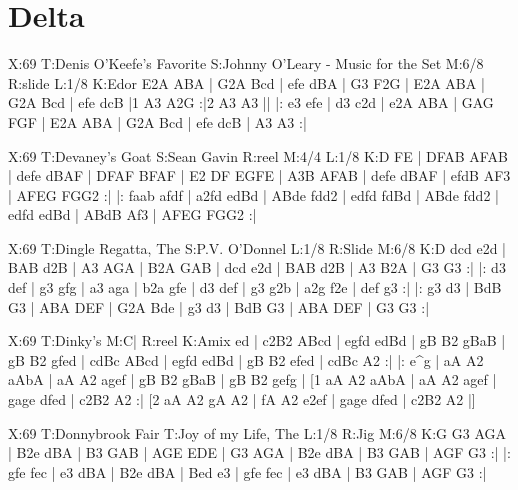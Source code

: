 \documentclass{article}
\begin{document}
\section{Delta}


\begin{abc}[name]
X:69
T:Denis O'Keefe's Favorite
S:Johnny O'Leary - Music for the Set
M:6/8
R:slide
L:1/8
K:Edor
E2A ABA | G2A Bcd | efe dBA | G3 F2G |
E2A ABA | G2A Bcd | efe dcB |1 A3 A2G :|2 A3 A3 ||
|: e3 efe | d3 c2d | e2A ABA | GAG FGF |
E2A ABA | G2A Bcd | efe dcB | A3 A3 :|

\begin{abc}[name]
X:69
T:Devaney's Goat
S:Sean Gavin
R:reel
M:4/4
L:1/8
K:D
FE | DFAB AFAB | defe dBAF | DFAF BFAF | E2 DF EGFE |
A3B AFAB | defe dBAF | efdB AF3 | AFEG FGG2 :|
|: faab afdf | a2fd edBd | ABde fdd2 | edfd fdBd |
ABde fdd2 | edfd edBd | ABdB Af3 | AFEG FGG2 :|
\end{abc}

\begin{abc}[name]
X:69
T:Dingle Regatta, The
S:P.V. O'Donnel
L:1/8
R:Slide
M:6/8
K:D
dcd e2d | BAB d2B | A3 AGA | B2A GAB |
dcd e2d | BAB d2B | A3 B2A | G3 G3 :|
|: d3 def | g3 gfg | a3 aga | b2a gfe |
d3 def | g3 g2b | a2g f2e | def g3 :|
|: g3 d3 | BdB G3 | ABA DEF | G2A Bde |
g3 d3 | BdB G3 | ABA DEF | G3 G3 :|
\end{abc}

\begin{abc}[name]
X:69
T:Dinky's
M:C|
R:reel
K:Amix
ed | c2B2 ABcd | egfd edBd | gB B2 gBaB | gB B2 gfed |
cdBc ABcd | egfd edBd | gB B2 efed | cdBc A2 :|
|: e^g | aA A2 aAbA | aA A2 agef | gB B2 gBaB | gB B2 gefg |
[1 aA A2 aAbA | aA A2 agef | gage dfed | c2B2 A2 :|
[2 aA A2 gA A2 | fA A2 e2ef | gage dfed | c2B2 A2 |]
\end{abc}

\begin{abc}[name]
X:69
T:Donnybrook Fair
T:Joy of my Life, The
L:1/8
R:Jig
M:6/8
K:G
G3 AGA | B2e dBA | B3 GAB | AGE EDE |
G3 AGA | B2e dBA | B3 GAB | AGF G3 :|
|: gfe fec | e3 dBA | B2e dBA | Bed e3 |
gfe fec | e3 dBA | B3 GAB | AGF G3 :|
\end{abc}


\end{abc}
\end{document}
